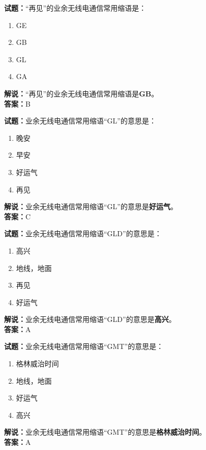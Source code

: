 \documentclass{ctexbook}
\begin{document}
\vspace{1em}

\textbf{试题：}“再见”的业余无线电通信常用缩语是：
\begin{enumerate}[leftmargin=3em]
  \item GE
  \item GB
  \item GL
  \item GA
\end{enumerate}
\noindent\textbf{解说：}“再见”的业余无线电通信常用缩语是\textbf{GB}。\\\noindent\textbf{答案：}B

\vspace{1em}

\textbf{试题：}业余无线电通信常用缩语“GL”的意思是：
\begin{enumerate}[leftmargin=3em]
  \item 晚安
  \item 早安
  \item 好运气
  \item 再见
\end{enumerate}
\noindent\textbf{解说：}业余无线电通信常用缩语“GL”的意思是\textbf{好运气}。\\\noindent\textbf{答案：}C

\vspace{1em}

\textbf{试题：}业余无线电通信常用缩语“GLD”的意思是：
\begin{enumerate}[leftmargin=3em]
  \item 高兴
  \item 地线，地面
  \item 再见
  \item 好运气
\end{enumerate}
\noindent\textbf{解说：}业余无线电通信常用缩语“GLD”的意思是\textbf{高兴}。\\\noindent\textbf{答案：}A

\vspace{1em}

\textbf{试题：}业余无线电通信常用缩语“GMT”的意思是：
\begin{enumerate}[leftmargin=3em]
  \item 格林威治时间
  \item 地线，地面
  \item 好运气
  \item 高兴
\end{enumerate}
\noindent\textbf{解说：}业余无线电通信常用缩语“GMT”的意思是\textbf{格林威治时间}。\\\noindent\textbf{答案：}A
\end{document}

